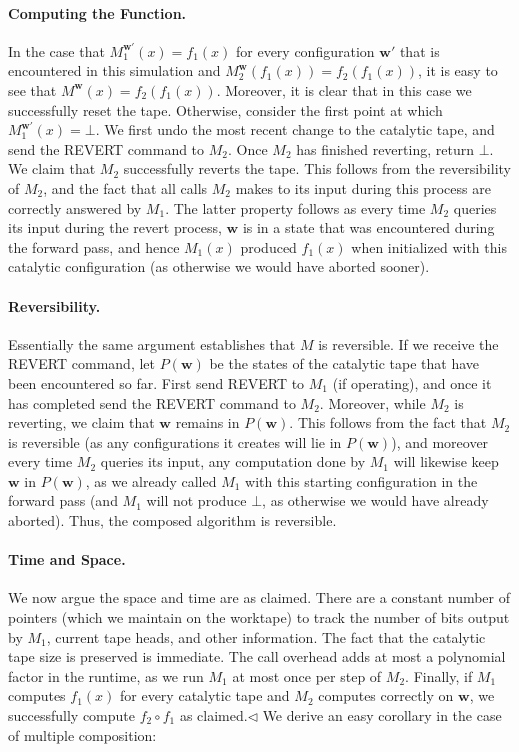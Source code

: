 \paragraph{Computing the Function.} In the case that $M_1^{\mathbf w'}(x)=f_1(x)$ for every configuration $\mathbf w'$ that is encountered in this simulation and $M_2^{\mathbf w}(f_1(x))=f_2(f_1(x))$, it is easy to see that $M^{\mathbf w}(x)=f_2(f_1(x))$. Moreover, it is clear that in this case we successfully reset the tape.
Otherwise, consider the first point at which $M_1^{\mathbf w'}(x)=\bot$. We first undo the most recent change to the catalytic tape, and send the REVERT command to $M_2$. Once $M_2$ has finished reverting, return $\bot$. We claim that $M_2$ successfully reverts the tape. This follows from the reversibility of $M_2$, and the fact that all calls $M_2$ makes to its input during this process are correctly answered by $M_1$. The latter property follows as every time $M_2$ queries its input during the revert process, $\mathbf w$ is in a state that was encountered during the forward pass, and hence $M_1(x)$ produced $f_1(x)$ when initialized with this catalytic configuration (as otherwise we would have aborted sooner).
\paragraph{Reversibility.} Essentially the same argument establishes that $M$ is reversible. If we receive the REVERT command, let $P(\mathbf w)$ be the states of the catalytic tape that have been encountered so far. First send REVERT to $M_1$ (if operating), and once it has completed send the REVERT command to $M_2$. Moreover, while $M_2$ is reverting, we claim that $\mathbf w$ remains in $P(\mathbf w)$. This follows from the fact that $M_2$ is reversible (as any configurations it creates will lie in $P(\mathbf w)$), and moreover every time $M_2$ queries its input, any computation done by $M_1$ will likewise keep $\mathbf w$ in $P(\mathbf w)$, as we already called $M_1$ with this starting configuration in the forward pass (and $M_1$ will not produce $\bot$, as otherwise we would have already aborted). Thus, the composed algorithm is reversible.
\paragraph{Time and Space.} We now argue the space and time are as claimed. There are a constant number of pointers (which we maintain on the worktape) to track the number of bits output by $M_1$, current tape heads, and other information. The fact that the catalytic tape size is preserved is immediate. The call overhead adds at most a polynomial factor in the runtime, as we run $M_1$ at most once per step of $M_2$. Finally, if $M_1$ computes $f_1(x)$ for every catalytic tape and $M_2$ computes correctly on $\mathbf w$, we successfully compute $f_2\circ f_1$ as claimed.\hfill$\triangleleft$
We derive an easy corollary in the case of multiple composition:
